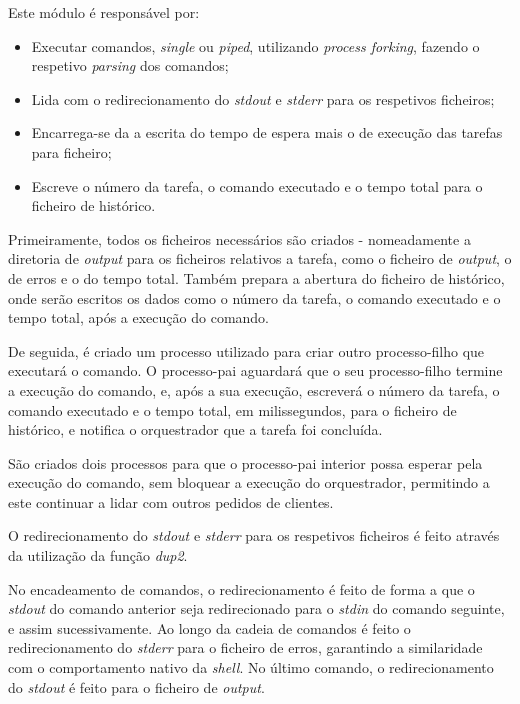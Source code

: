 \documentclass[a4paper,11pt]{scrreprt}
\begin{document}
            Este módulo é responsável por:
            \begin{itemize}
                \item Executar comandos, \textit{single} ou \textit{piped}, utilizando \textit{process forking},
                    fazendo o respetivo \textit{parsing} dos comandos;
                \item Lida com o redirecionamento do \textit{stdout} e \textit{stderr} para os respetivos ficheiros;
                \item Encarrega-se da a escrita do tempo de espera mais o de execução das tarefas para ficheiro;
                \item Escreve o número da tarefa, o comando executado e o tempo total para o ficheiro de histórico.
            \end{itemize}

            Primeiramente, todos os ficheiros necessários são criados - nomeadamente a diretoria de
            \textit{output} para os ficheiros relativos a tarefa, como o ficheiro de \textit{output},
            o de erros e o do tempo total.
            Também prepara a abertura do ficheiro de histórico, onde serão escritos os dados como o número da tarefa,
            o comando executado e o tempo total, após a execução do comando.

            De seguida, é criado um processo utilizado para criar outro processo-filho que executará o comando.
            O processo-pai aguardará que o seu processo-filho termine a execução do comando, e, após a sua execução,
            escreverá o número da tarefa, o comando executado e o tempo total, em milissegundos, para o ficheiro de histórico,
            e notifica o orquestrador que a tarefa foi concluída.

            São criados dois processos para que o processo-pai interior possa esperar pela execução do comando,
            sem bloquear a execução do orquestrador, permitindo a este continuar a lidar com outros pedidos de clientes.

            O redirecionamento do \textit{stdout} e \textit{stderr} para os respetivos ficheiros é feito
            através da utilização da função \textit{dup2}.

            No encadeamento de comandos, o redirecionamento é feito de forma a que o \textit{stdout} do comando
            anterior seja redirecionado para o \textit{stdin} do comando seguinte, e assim sucessivamente. Ao longo
            da cadeia de comandos é feito o redirecionamento do \textit{stderr} para o ficheiro de erros, garantindo
            a similaridade com o comportamento nativo da \textit{shell}. No último comando, o redirecionamento do
            \textit{stdout} é feito para o ficheiro de \textit{output}.
\end{document}
